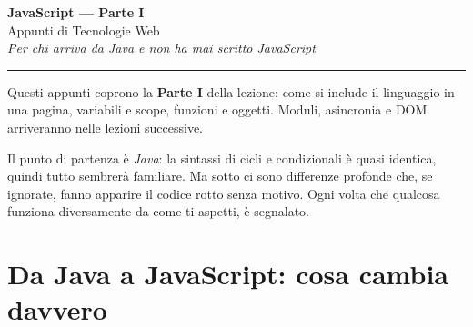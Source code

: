 \documentclass[10pt,a4paper]{article}
\begin{document}
\begin{center}
  {\LARGE\bfseries JavaScript --- Parte I}\\[4pt]
  {\large Appunti di Tecnologie Web}\\[2pt]
  {\small\itshape Per chi arriva da Java e non ha mai scritto JavaScript}
\end{center}

\vspace{4pt}
\hrule
\vspace{10pt}

Questi appunti coprono la \textbf{Parte I} della lezione: come si include il linguaggio in una pagina, variabili e scope, funzioni e oggetti. Moduli, asincronia e DOM arriveranno nelle lezioni successive.

Il punto di partenza è \emph{Java}: la sintassi di cicli e condizionali è quasi identica, quindi tutto sembrerà familiare. Ma sotto ci sono differenze profonde che, se ignorate, fanno apparire il codice rotto senza motivo. Ogni volta che qualcosa funziona diversamente da come ti aspetti, è segnalato.

\tableofcontents
\newpage

\section{Da Java a JavaScript: cosa cambia davvero}
\end{document}
